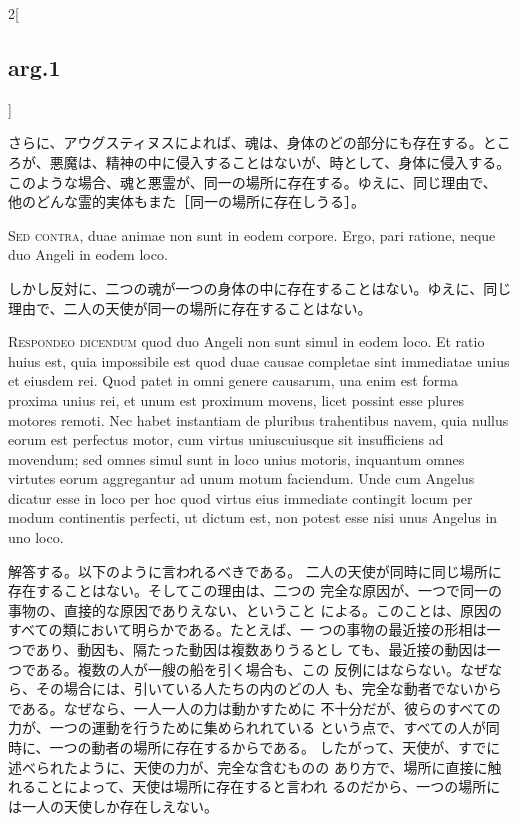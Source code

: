 \documentclass[paper=a4paper,fontsize=10pt,jafontsize=9pt,titlepage]{jlreq}
\begin{document}
\begin{paracol}{2}[\subsection{arg.1}]
\switchcolumn

さらに、アウグスティヌスによれば、魂は、身体のどの部分にも存在する。とこ
 ろが、悪魔は、精神の中に侵入することはないが、時として、身体に侵入する。
 このような場合、魂と悪霊が、同一の場所に存在する。ゆえに、同じ理由で、
 他のどんな霊的実体もまた［同一の場所に存在しうる］。

\switchcolumn*[\subsection{s.c.}]

{\scshape Sed contra}, duae animae non sunt in eodem
 corpore. Ergo, pari ratione, neque duo Angeli in eodem loco.

\switchcolumn

しかし反対に、二つの魂が一つの身体の中に存在することはない。ゆえに、同じ
 理由で、二人の天使が同一の場所に存在することはない。


{\scshape Respondeo dicendum} quod duo Angeli non sunt
 simul in eodem loco. Et ratio huius est, quia impossibile est quod duae
 causae completae sint immediatae unius et eiusdem rei. Quod patet in
 omni genere causarum, una enim est forma proxima unius rei, et unum est
 proximum movens, licet possint esse plures motores remoti. Nec habet
 instantiam de pluribus trahentibus navem, quia nullus eorum est
 perfectus motor, cum virtus uniuscuiusque sit insufficiens ad movendum;
 sed omnes simul sunt in loco unius motoris, inquantum omnes virtutes
 eorum aggregantur ad unum motum faciendum. Unde cum Angelus dicatur
 esse in loco per hoc quod virtus eius immediate contingit locum per
 modum continentis perfecti, ut dictum est, non potest esse nisi unus
 Angelus in uno loco.

\switchcolumn

解答する。以下のように言われるべきである。
二人の天使が同時に同じ場所に存在することはない。そしてこの理由は、二つの
 完全な原因が、一つで同一の事物の、直接的な原因でありえない、ということ
 による。このことは、原因のすべての類において明らかである。たとえば、一
 つの事物の最近接の形相は一つであり、動因も、隔たった動因は複数ありうるとし
 ても、最近接の動因は一つである。複数の人が一艘の船を引く場合も、この
 反例にはならない。なぜなら、その場合には、引いている人たちの内のどの人
 も、完全な動者でないからである。なぜなら、一人一人の力は動かすために
 不十分だが、彼らのすべての力が、一つの運動を行うために集められれている
 という点で、すべての人が同時に、一つの動者の場所に存在するからである。
したがって、天使が、すでに述べられたように、天使の力が、完全な含むものの
 あり方で、場所に直接に触れることによって、天使は場所に存在すると言われ
 るのだから、一つの場所には一人の天使しか存在しえない。


\end{paracol}
\end{document}
